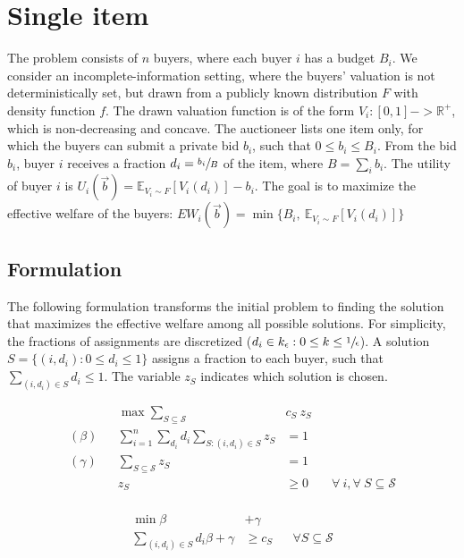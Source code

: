 \section{Single item}

The problem consists of $n$ buyers, where each buyer $i$ has a budget $B_i$.
We consider an incomplete-information setting, where the buyers' valuation is not deterministically set, but drawn from a publicly known distribution $F$ with density function $f$. The drawn valuation function is of the form $V_i : [0,1] -> \mathbb{R}^+$, which is non-decreasing and concave. The auctioneer lists one item only, for which the buyers can submit a private bid $b_i$, such that $0 \le b_i \le B_i$. From the bid $b_i$, buyer $i$ receives a fraction $d_i = \sfrac{b_i}{B}$ of the item, where $B = \sum_i b_i$. The utility of buyer $i$ is $U_i(\vec{b}) = \mathbb{E}_{V_i \sim F}[V_i(d_i)] - b_i$. The goal is to maximize the effective welfare of the buyers: $EW_i(\vec{b}) = \min\{B_i,\  \mathbb{E}_{V_i \sim F}[V_i(d_i)]\}$

\subsection{Formulation}

The following formulation transforms the initial problem to finding the solution that maximizes the effective welfare among all possible solutions. For simplicity, the fractions of assignments are discretized ($d_i \in k_{\epsilon} : 0 \le k \le \sfrac{1}{\epsilon}$). A solution $S = \{(i, d_i) : 0 \le d_i \le 1\}$ assigns a fraction to each buyer, such that $\sum_{(i,d_{i}) \in S} d_{i} \le 1$. The variable $z_S$ indicates which solution is chosen.

\begin{minipage}[t]{0.59\textwidth}
	\begin{align*}
		&& \max  \sum_{S \subseteq \mathcal{S}} &c_{S}\ z_{S} \\
		(\beta) && \sum_{i=1}^{n} \sum_{d_{i}} d_{i} \sum_{S: (i,d_{i}) \in S } z_{S} &= 1 & & \\
		(\gamma) && \sum_{S \subseteq \mathcal{S}} z_{S}  &= 1	& & \\
		&& z_{S} &\geq 0 & & \forall\ i, \forall\ S \subseteq \mathcal{S}\\
	\end{align*}
\end{minipage}
\begin{minipage}[t]{0.3\textwidth}
	\begin{align*}
		\min \beta &+ \gamma \\
		\sum_{(i,d_{i}) \in S} d_{i} \beta + \gamma &\geq c_{S}  & & \forall S \subseteq \mathcal{S}\\
\end{align*}
\end{minipage}


